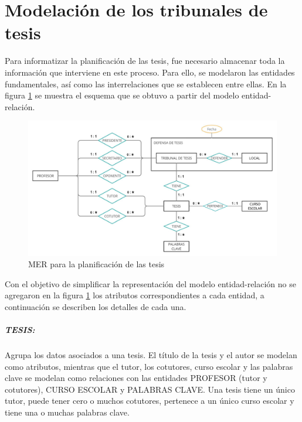    

\section{Modelación de los tribunales de tesis}\label{database:planificación-tesis}
Para informatizar la planificación de las tesis, fue 
necesario almacenar toda la información que interviene en este proceso.
Para ello, se modelaron las entidades fundamentales, así como las interrelaciones
que se establecen entre ellas. En la figura \ref{merxx-thesis} se muestra el esquema que se obtuvo a partir 
del modelo entidad-relación.




\begin{figure}[H]
    \includegraphics[scale=0.31]{Graphics/Database/MERXX-TC-FINAL.png}
    \caption{MER para la planificación de las tesis}
    \label{merxx-thesis}
\end{figure}


Con el objetivo de simplificar la representación del modelo entidad-relación
no se agregaron en la figura \ref{merxx-thesis} los atributos correspondientes a cada entidad,
a continuación se describen los detalles de cada una.

\subparagraph{TESIS:}
Agrupa los datos asociados a una tesis.
El título de la tesis y el autor se modelan como atributos, mientras que
el tutor, los cotutores, curso escolar y las palabras clave se modelan como relaciones con 
las entidades PROFESOR (tutor y cotutores), CURSO ESCOLAR y PALABRAS CLAVE.
Una tesis tiene un único tutor, puede tener cero o muchos cotutores, pertenece a 
un único curso escolar y tiene una o muchas palabras clave. 

